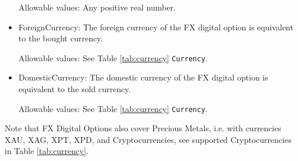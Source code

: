 \begin{itemize}
Allowable values:  Any positive real number.

\item ForeignCurrency: The foreign currency of the FX digital  option is equivalent to the bought currency.  

Allowable values:  See Table \ref{tab:currency} \lstinline!Currency!.

\item DomesticCurrency: The domestic currency of the FX digital  option is equivalent to the sold currency. 

Allowable values:  See Table \ref{tab:currency} \lstinline!Currency!.

\end{itemize}

Note that FX Digital Options also cover Precious Metals, i.e. with
currencies XAU, XAG, XPT, XPD, and Cryptocurrencies,  see supported Cryptocurrencies in Table \ref{tab:currency}.
